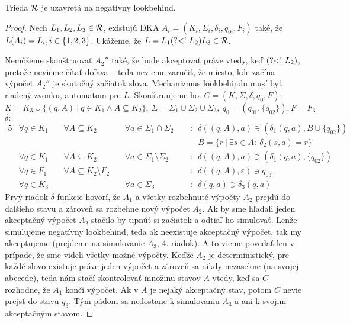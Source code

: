 \begin{lema}\label{nlb+R}
Trieda ${\cal R}$ je uzavretá na negatívny lookbehind.
\end{lema}
\begin{proof}
Nech $L_1,L_2,L_3 \in {\cal R}$, existujú DKA $ A_{i} = (K_{i},\Sigma_{i},\delta_{i},q_{0i},F_{i}) $ také, že $ L(A_{i})=\nobreak L_{i},\allowbreak i \in \lbrace 1,2,3\rbrace $. Ukážeme, že $L=L_1\text{(?\textless !~} L_2)L_3 \in {\cal R}$.

Nemôžeme skonštruovať $A_2''$ také, že bude akceptovať práve vte\-dy, keď $\text{(?\textless !~} L_2)$, pretože nevieme čítať doľava -- teda nevieme zaručiť, že miesto, kde začína výpočet $A_2''$ je skutočný začiatok slova. Mechanizmus lookbehindu musí byť riadený zvonku, automatom pre $L$. Skonštruujeme ho. $C=(K,\Sigma, \delta,q_0,F):$ 
$$K=K_3\cup \lbrace (q,A) ~|~ q \in K_1 \wedge A \subseteq K_2 \rbrace,~\Sigma = \Sigma_1\cup\Sigma_2\cup\Sigma_3,~q_0=(q_{01},\lbrace q_{02}\rbrace),F=F_3$$
$\delta:$
\begin{alignat*}{5}
& \forall q \in K_1 ~&& \forall A \subseteq K_2  && ~ \forall a \in \Sigma_1 \cap \Sigma_2 &&~~:~~ \delta((q,A),a) \ni (\delta_1(q,a), B\cup \lbrace q_{02}\rbrace)\\ 
&                   ~&&                          && &&~~~~~~B=\lbrace r ~|~ \exists s \in A:~ \delta_2(s,a)=r \rbrace \\
& \forall q \in K_1 ~&& \forall A \subseteq K_2  &&~\forall a \in \Sigma_1 \setminus \Sigma_2 &&~~:~~ \delta((q,A),a) \ni (\delta_1(q,a),\lbrace q_{02}\rbrace) \\
& \forall q \in F_1 ~&& \forall A \subseteq K_2 \setminus F_2 && &&~~:~~ \delta((q,A),\varepsilon) \ni q_{03} \\
& \forall q \in K_3 ~&&                          &&~ \forall a \in \Sigma_3 &&~~:~~ \delta(q,a) \ni \delta_3(q,a)
\end{alignat*}
Prvý riadok $\delta$-funkcie hovorí, že $A_1$ a všetky rozbehnuté výpočty $A_2$ prejdú do ďalšieho stavu a zároveň sa rozbehne nový výpočet $A_2$. Ak by sme hľadali jeden akceptačný výpočet $A_2$ stačilo by tipnúť si začiatok a odtiaľ ho simulovať. Lenže simulujeme negatívny lookbehind, teda ak neexistuje akceptačný výpočet, tak my akceptujeme (prejdeme na simulovanie $A_3$, 4. riadok). A to vieme povedať len v prípade, že sme videli všetky možné výpočty. Keďže $A_2$ je deterministický, pre každé slovo existuje práve jeden výpočet a zároveň sa nikdy nezasekne (na svojej abecede), teda nám stačí skontrolovať množinu stavov $A$ vtedy, keď sa $C$ rozhodne, že $A_1$ končí výpočet. Ak v $A$ je nejaký akceptačný stav, potom $C$ nevie prejsť do stavu $q_3$. Tým pádom sa nedostane k simulovaniu $A_3$ a ani k svojim akceptačným stavom.


\end{proof}

